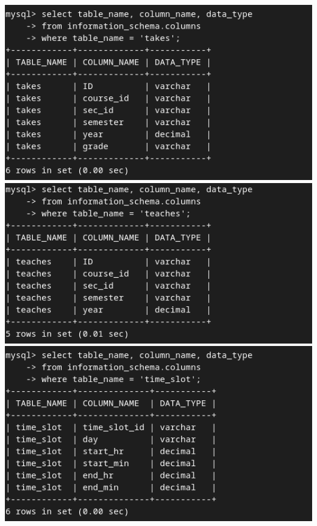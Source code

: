 \documentclass{article}
\begin{document}
\begin{center}
    \includegraphics[scale=0.6]{6-9.png}
    \includegraphics[scale=0.6]{6-10.png}
    \includegraphics[scale=0.6]{6-11.png}
\end{center}

\newpage
\end{document}
